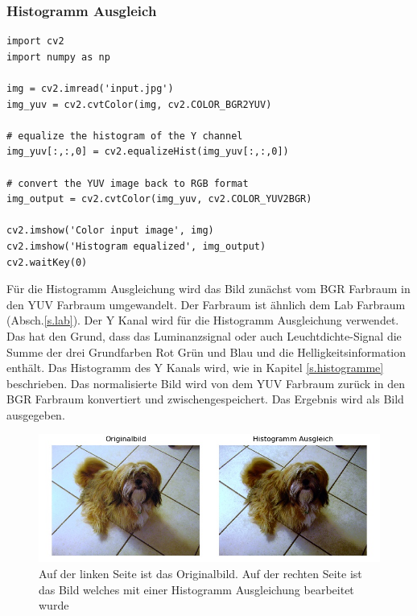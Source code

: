 \documentclass[a4paper,12pt,oneside]{article}
\begin{document}
\subsubsection{Histogramm Ausgleich}
\begin{lstlisting}
import cv2
import numpy as np

img = cv2.imread('input.jpg')
img_yuv = cv2.cvtColor(img, cv2.COLOR_BGR2YUV)

# equalize the histogram of the Y channel
img_yuv[:,:,0] = cv2.equalizeHist(img_yuv[:,:,0])

# convert the YUV image back to RGB format
img_output = cv2.cvtColor(img_yuv, cv2.COLOR_YUV2BGR)

cv2.imshow('Color input image', img)
cv2.imshow('Histogram equalized', img_output)
cv2.waitKey(0)
\end{lstlisting}
Für die Histogramm Ausgleichung \cite{histogram2012equalisation} wird das Bild zunächst vom BGR Farbraum in den YUV Farbraum umgewandelt. Der Farbraum ist ähnlich dem Lab Farbraum (Absch.\ref{s.lab}). Der Y Kanal wird für die Histogramm Ausgleichung verwendet. Das hat den Grund, dass das Luminanzsignal oder auch Leuchtdichte-Signal die Summe der drei Grundfarben Rot Grün und Blau und die Helligkeitsinformation enthält. Das Histogramm des Y Kanals wird, wie in Kapitel \ref{s.histogramme} beschrieben. Das normalisierte Bild wird von dem YUV Farbraum zurück in den BGR Farbraum konvertiert und zwischengespeichert. Das Ergebnis wird als Bild ausgegeben.
\begin{figure}
	[h]
	\centering
	\includegraphics[scale=0.7]{Sources/histeq.jpg}
	\caption{Auf der linken Seite ist das Originalbild. Auf der rechten Seite ist das Bild welches mit einer Histogramm Ausgleichung bearbeitet wurde}
	\label{img:histogrameq}
\end{figure}
	
\end{document}
